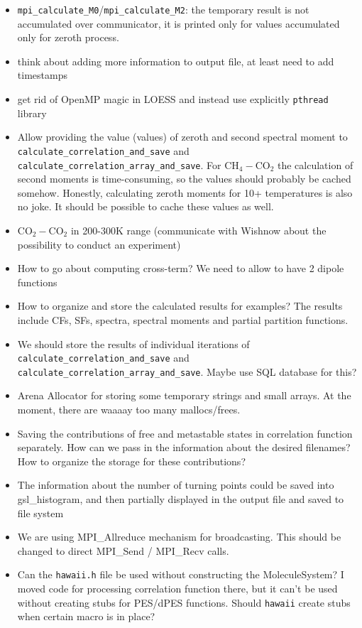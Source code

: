\documentclass{article}
\begin{document}
\begin{itemize}
    \item \texttt{mpi\_calculate\_M0}/\texttt{mpi\_calculate\_M2}: the temporary result is not accumulated over communicator, it is printed only for values accumulated only for zeroth process.
    \item think about adding more information to output file, at least need to add timestamps 
    \item get rid of OpenMP magic in LOESS and instead use explicitly \texttt{pthread} library 
    \item Allow providing the value (values) of zeroth and second spectral moment to \texttt{calculate\_correlation\_and\_save} and \texttt{calculate\_correlation\_array\_and\_save}. {\color{red} For CH$_4-$CO$_2$ the calculation of second moments is time-consuming, so the values should probably be cached somehow. Honestly, calculating zeroth moments for 10+ temperatures is also no joke. It should be possible to cache these values as well.}
    \item CO$_2-$CO$_2$ in 200-300K range (communicate with Wishnow about the possibility to conduct an experiment)
    \item How to go about computing cross-term? We need to allow to have 2 dipole functions
    \item How to organize and store the calculated results for examples? The results include CFs, SFs, spectra, spectral moments and partial partition functions.
    \item We should store the results of individual iterations of \texttt{calculate\_correlation\_and\_save} and \texttt{calculate\_correlation\_array\_and\_save}. Maybe use SQL database for this?
    \item Arena Allocator for storing some temporary strings and small arrays. At the moment, there are waaaay too many mallocs/frees. 
    \item Saving the contributions of free and metastable states in correlation function separately. How can we pass in the information about the desired filenames? How to organize the storage for these contributions? 
    \item The information about the number of turning points could be saved into gsl\_histogram, and then partially displayed in the output file and saved to file system
    \item We are using MPI\_Allreduce mechanism for broadcasting. This should be changed to direct MPI\_Send / MPI\_Recv calls.
    \item Can the \texttt{hawaii.h} file be used without constructing the MoleculeSystem? I moved code for processing correlation function there, but it can't be used without creating stubs for PES/dPES functions. Should \texttt{hawaii} create stubs when certain macro is in place? 

\end{itemize}
\end{document}
